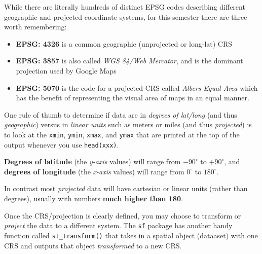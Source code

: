 \documentclass[
]{book}
\providecommand{\tightlist}{%
  \setlength{\itemsep}{0pt}\setlength{\parskip}{0pt}}
\newenvironment{rmdtip}[1]
  {
  \begin{itemize}
  \renewcommand{\labelitemi}{
    \raisebox{-.7\height}[0pt][0pt]{
      {\setkeys{Gin}{width=3em,keepaspectratio}\texttt{[image: images/\#1]}}
    }
  }
  \setlength{\fboxsep}{1em}
  \begin{tip}
  \item
  }
  {
  \end{tip}
  \end{itemize}
  }
\begin{document}
While there are literally hundreds of distinct EPSG codes describing different geographic and projected coordinate systems, for this semester there are three worth remembering:

\begin{itemize}
\tightlist
\item
  \textbf{EPSG: 4326} is a common geographic (unprojected or long-lat) CRS
\item
  \textbf{EPSG: 3857} is also called \emph{WGS 84/Web Mercator}, and is the dominant projection used by Google Maps
\item
  \textbf{EPSG: 5070} is the code for a projected CRS called \emph{Albers Equal Area} which has the benefit of representing the visual area of maps in an equal manner.
\end{itemize}

\begin{rmdtip}{tip}
One rule of thumb to determine if data are in \emph{degrees of lat/long} (and thus \emph{geographic}) versus in \emph{linear units} such as meters or miles (and thus \emph{projected}) is to look at the \texttt{xmin}, \texttt{ymin}, \texttt{xmax}, and \texttt{ymax} that are printed at the top of the output whenever you use \texttt{head(xxx)}.

\textbf{Degrees of latitude} (the \emph{y-axis} values) will range from \(-90^\circ\) to \(+90^\circ\), and \textbf{degrees of longitude} (the \emph{x-axis} values) will range from \(0^\circ\) to \(180^\circ\).

In contrast most \emph{projected} data will have cartesian or linear units (rather than degrees), usually with numbers \textbf{much higher than 180}.

\end{rmdtip}

Once the CRS/projection is clearly defined, you may choose to transform or \emph{project} the data to a different system. The \texttt{sf} package has another handy function called \texttt{st\_transform()} that takes in a spatial object (dataaset) with one CRS and outputs that object \emph{transformed} to a new CRS.
\end{document}
